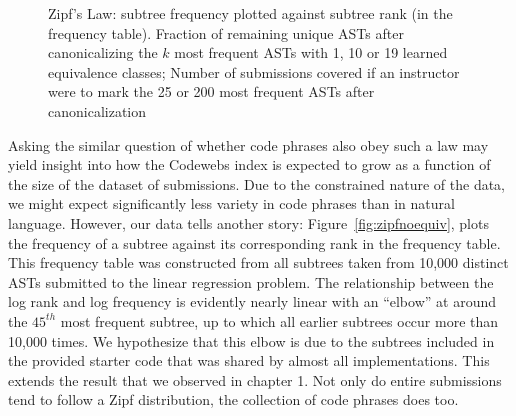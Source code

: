 \begin{figure}[t!]
  \center

  \caption[How use of equivalence classes change teacher impact]{
  Zipf's Law: subtree frequency plotted against subtree rank (in the frequency table).
   Fraction of remaining unique ASTs after canonicalizing the $k$ most frequent ASTs with 1, 10 or 19 learned equivalence classes;
   Number of submissions covered if an instructor were to mark the 25 or 200 most frequent ASTs after canonicalization
  }

  \label{fig:zipfreduction}
\end{figure}

Asking the similar question of whether code phrases also obey such a law may yield
insight into how the Codewebs index is expected to grow as a function of the size of the dataset of submissions.
Due to the constrained nature of the data, we might expect significantly 
less variety in code phrases than in natural language.  However, our data tells another story: Figure~\ref{fig:zipfnoequiv},
plots the frequency of a subtree against its corresponding rank in the frequency table.  This frequency table was constructed 
from all subtrees taken from 10,000 distinct ASTs submitted to the linear regression problem.
The relationship between the log rank and log frequency is evidently nearly linear
 with an ``elbow'' at around the $45^{th}$ most frequent subtree, up to which all earlier subtrees occur more than 10,000 times.  
 We hypothesize that this elbow is due to the subtrees included in the provided starter code that was shared by almost all implementations. This extends the result that we observed in chapter 1. Not only do entire submissions tend to follow a Zipf distribution, the collection of code phrases does too.

